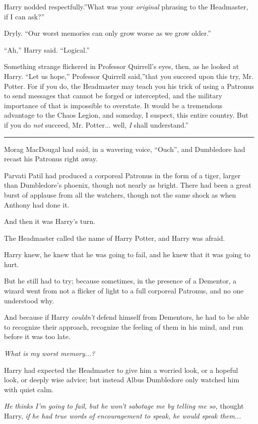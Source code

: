 Harry nodded respectfully.''What was your \emph{original} phrasing to
the Headmaster, if I can ask?''

Dryly. ``Our worst memories can only grow worse as we grow older.''

``Ah,'' Harry said. ``Logical.''

Something strange flickered in Professor Quirrell's eyes, then, as he
looked at Harry. ``Let us hope,'' Professor Quirrell said,''that you
succeed upon this try, Mr. Potter. For if you do, the Headmaster may
teach you his trick of using a Patronus to send messages that cannot be
forged or intercepted, and the military importance of that is impossible
to overstate. It would be a tremendous advantage to the Chaos Legion,
and someday, I suspect, this entire country. But if you do \emph{not}
succeed, Mr. Potter... well, \emph{I} shall understand.''

\begin{center}\rule{3in}{0.4pt}\end{center}

Morag MacDougal had said, in a wavering voice, ``Ouch'', and Dumbledore
had recast his Patronus right away.

Parvati Patil had produced a corporeal Patronus in the form of a tiger,
larger than Dumbledore's phoenix, though not nearly as bright. There had
been a great burst of applause from all the watchers, though not the
same shock as when Anthony had done it.

And then it was Harry's turn.

The Headmaster called the name of Harry Potter, and Harry was afraid.

Harry knew, he knew that he was going to fail, and he knew that it was
going to hurt.

But he still had to try; because sometimes, in the presence of a
Dementor, a wizard went from not a flicker of light to a full corporeal
Patronus, and no one understood why.

And because if Harry \emph{couldn't} defend himself from Dementors, he
had to be able to recognize their approach, recognize the feeling of
them in his mind, and run before it was too late.

\emph{What is my worst memory...?}

Harry had expected the Headmaster to give him a worried look, or a
hopeful look, or deeply wise advice; but instead Albus Dumbledore only
watched him with quiet calm.

\emph{He thinks I'm going to fail, but he won't sabotage me by telling
me so,} thought Harry, \emph{if he had true words of encouragement to
speak, he would speak them...}

